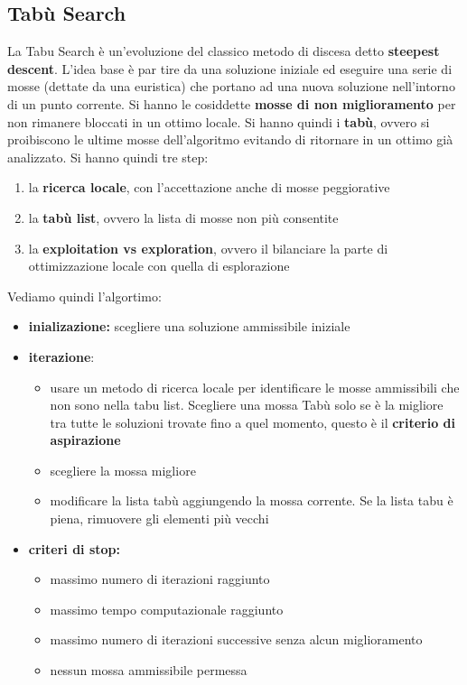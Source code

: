 \message{ !name(ro.tex)}\documentclass[a4paper,12pt, oneside]{book}
\begin{document}
\subsection{Tabù Search}
La Tabu Search è un'evoluzione del classico metodo di discesa detto
\textbf{steepest descent}. L’idea base è par tire da una soluzione
iniziale ed eseguire una serie di mosse (dettate da una euristica) che
portano ad una nuova soluzione nell’intorno di un punto corrente. Si
hanno le cosiddette \textbf{mosse di non miglioramento} per non
rimanere bloccati in un ottimo locale. Si hanno quindi i
\textbf{tabù}, ovvero si proibiscono le ultime mosse dell'algoritmo
evitando di ritornare in un ottimo già analizzato. Si hanno quindi tre
step:
\begin{enumerate}
  \item la \textbf{ricerca locale}, con l’accettazione anche di mosse
  peggiorative
  \item la \textbf{tabù list}, ovvero la lista di mosse non più
  consentite
  \item la \textbf{exploitation vs exploration}, ovvero il bilanciare
  la parte di ottimizzazione locale con quella di esplorazione 
\end{enumerate}
Vediamo quindi l'algortimo:
\begin{itemize}
  \item \textbf{inializazione:} scegliere una soluzione ammissibile
  iniziale
  \item \textbf{iterazione}:
  \begin{itemize}
    \item usare un metodo di ricerca locale per identificare le mosse
    ammissibili che non sono nella tabu list. Scegliere una mossa Tabù
    solo se è la migliore tra tutte le soluzioni trovate fino a quel
    momento, questo è il \textbf{criterio di aspirazione}
    \item scegliere la mossa migliore
    \item modificare la lista tabù aggiungendo la mossa corrente. Se
    la lista tabu è piena, rimuovere gli elementi più vecchi 
  \end{itemize}
  \item \textbf{criteri di stop:}
  \begin{itemize}
    \item massimo numero di iterazioni raggiunto
    \item massimo tempo computazionale raggiunto
    \item massimo numero di iterazioni successive senza alcun
    miglioramento
    \item nessun mossa ammissibile permessa
  \end{itemize}
\end{itemize}
\end{document}
